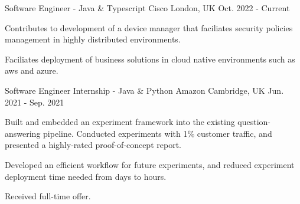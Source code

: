 

\begin{cventries}


\cventry
    {Software Engineer - Java \& Typescript} %
    {Cisco} %
    {London, UK} %
    {Oct. 2022 - Current} %
    {
      \begin{cvitems} %
        \item {Contributes to development of a device manager that faciliates security policies management in highly distributed environments.}
        \item {Faciliates deployment of business solutions in cloud native environments such as aws and azure.}
      \end{cvitems}
    }

  \cventry
    {Software Engineer Internship - Java \& Python} %
    {Amazon} %
    {Cambridge, UK} %
    {Jun. 2021 - Sep. 2021} %
    {
      \begin{cvitems} %
        \item {Built and embedded an experiment framework into the existing question-answering pipeline. Conducted experiments with 1\% customer traffic, and presented a highly-rated proof-of-concept report.}
        \item {Developed an efficient workflow for future experiments, and reduced experiment deployment time needed from days to hours.}
        \item {Received full-time offer.}
      \end{cvitems}
    }


\end{cventries}
